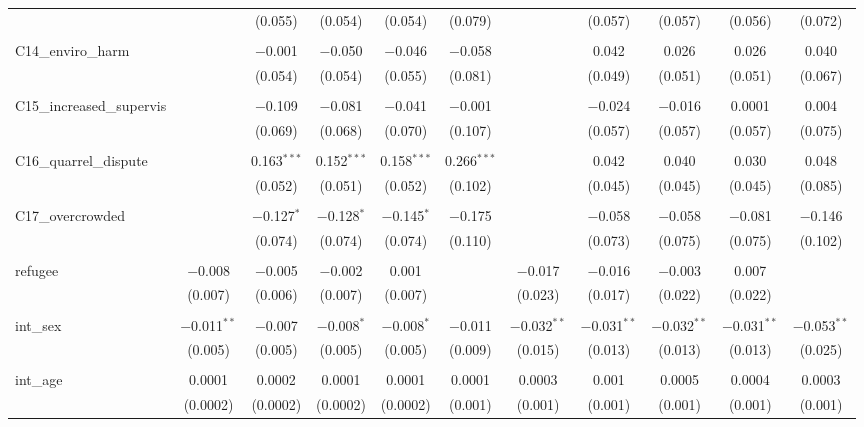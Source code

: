 \begin{table}[H]
\begin{tabular}{@{\extracolsep{4pt}}lcccccccccc}
  &  & (0.055) & (0.054) & (0.054) & (0.079) &  & (0.057) & (0.057) & (0.056) & (0.072) \\ 
  & & & & & & & & & & \\ 
 C14\_enviro\_harm &  & $-$0.001 & $-$0.050 & $-$0.046 & $-$0.058 &  & 0.042 & 0.026 & 0.026 & 0.040 \\ 
  &  & (0.054) & (0.054) & (0.055) & (0.081) &  & (0.049) & (0.051) & (0.051) & (0.067) \\ 
  & & & & & & & & & & \\ 
 C15\_increased\_supervis &  & $-$0.109 & $-$0.081 & $-$0.041 & $-$0.001 &  & $-$0.024 & $-$0.016 & 0.0001 & 0.004 \\ 
  &  & (0.069) & (0.068) & (0.070) & (0.107) &  & (0.057) & (0.057) & (0.057) & (0.075) \\ 
  & & & & & & & & & & \\ 
 C16\_quarrel\_dispute &  & 0.163$^{***}$ & 0.152$^{***}$ & 0.158$^{***}$ & 0.266$^{***}$ &  & 0.042 & 0.040 & 0.030 & 0.048 \\ 
  &  & (0.052) & (0.051) & (0.052) & (0.102) &  & (0.045) & (0.045) & (0.045) & (0.085) \\ 
  & & & & & & & & & & \\ 
 C17\_overcrowded &  & $-$0.127$^{*}$ & $-$0.128$^{*}$ & $-$0.145$^{*}$ & $-$0.175 &  & $-$0.058 & $-$0.058 & $-$0.081 & $-$0.146 \\ 
  &  & (0.074) & (0.074) & (0.074) & (0.110) &  & (0.073) & (0.075) & (0.075) & (0.102) \\ 
  & & & & & & & & & & \\ 
 refugee & $-$0.008 & $-$0.005 & $-$0.002 & 0.001 &  & $-$0.017 & $-$0.016 & $-$0.003 & 0.007 &  \\ 
  & (0.007) & (0.006) & (0.007) & (0.007) &  & (0.023) & (0.017) & (0.022) & (0.022) &  \\ 
  & & & & & & & & & & \\ 
 int\_sex & $-$0.011$^{**}$ & $-$0.007 & $-$0.008$^{*}$ & $-$0.008$^{*}$ & $-$0.011 & $-$0.032$^{**}$ & $-$0.031$^{**}$ & $-$0.032$^{**}$ & $-$0.031$^{**}$ & $-$0.053$^{**}$ \\ 
  & (0.005) & (0.005) & (0.005) & (0.005) & (0.009) & (0.015) & (0.013) & (0.013) & (0.013) & (0.025) \\ 
  & & & & & & & & & & \\ 
 int\_age & 0.0001 & 0.0002 & 0.0001 & 0.0001 & 0.0001 & 0.0003 & 0.001 & 0.0005 & 0.0004 & 0.0003 \\ 
  & (0.0002) & (0.0002) & (0.0002) & (0.0002) & (0.001) & (0.001) & (0.001) & (0.001) & (0.001) & (0.001) \\ 

\end{tabular}
\end{table}
